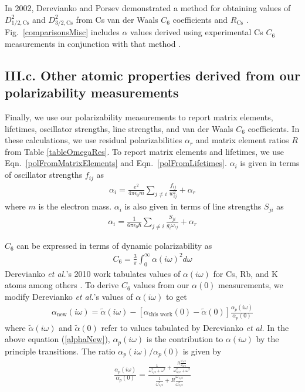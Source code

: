 \documentclass[twocolumn,pra,showpacs,superscriptaddress,longbibliography]{revtex4-1}   %
\newcommand{\figref}[1]{Fig.~\ref{#1}}
\newcommand{\eqnref}[1]{Eqn.~\eqref{#1}}
\newcommand{\rcs}{R_{\mathrm{Cs}}}
\newcommand{\etal}{\textit{et al.}}
\newcommand{\etalspace}{\textit{et al. }}
\begin{document}
In 2002, Derevianko and Porsev demonstrated a method for obtaining values of $D_{1/2,\mathrm{Cs}}^2$ and $D_{3/2,\mathrm{Cs}}^2$ from Cs van der Waals $C_6$ coefficients \cite{Derevianko2001} and $\rcs$ \cite{Rafac1998}. \figref{comparisonsMisc} includes $\alpha$ values derived using experimental Cs $C_6$ measurements in conjunction with that method \cite{Leo2000,Chin2004}.



\subsection{III.c. Other atomic properties derived from our polarizability measurements}

Finally, we use our polarizability measurements to report matrix elements, lifetimes, oscillator strengths, line strengths, and van der Waals $C_6$ coefficients.
In these calculations, we use residual polarizabilities $\alpha_r$ and matrix element ratios $R$ from Table \ref{tableOmegaRes}.
To report matrix elements and lifetimes, we use \eqnref{polFromMatrixElements} and \eqnref{polFromLifetimes}. $\alpha_i$ is given in terms of oscillator strengths $f_{ij}$ as 
\begin{align}
	\alpha_i = \frac{e^2}{4 \pi \epsilon_0 m}
	\sum_{j \neq i}
	\frac{f_{ij}}{w_{ij}^2}
	+ \alpha_r
	\label{polFromOscStr}
\end{align}
where $m$ is the electron mass. 
$\alpha_i$ is also given in terms of line strengths $S_{ji}$ as
\begin{align}
	\alpha_i = \frac{1}{6\pi\epsilon_0\hbar} 
	\sum_{j \neq i} 
	\frac{S_{ji}}{g_i\omega_{ij}}
	+ \alpha_r
	\label{polFromLineStr}
\end{align}


$C_6$ can be expressed in terms of dynamic polarizability as
\begin{align}
	C_6 = \frac{3}{\pi} \int_0^{\infty} \alpha(i\omega)^2 d\omega
	\label{C6fromPol}
\end{align}
Derevianko \etal's 2010 work tabulates values of $\alpha(i\omega)$ for Cs, Rb, and K atoms among others \cite{Derevianko2010}. To derive $C_6$ values from our $\alpha(0)$ measurements, we modify Derevianko \etal's values of $\alpha(i\omega)$ to get
\begin{align}
	\alpha_{\mathrm{new}}(i\omega) =
	\tilde{\alpha}(i\omega) -
	\left[\alpha_{\textrm{this work}}(0) - \tilde{\alpha}(0)\right]
	\frac{\alpha_p(i\omega)}{\alpha_p(0)}
	\label{alphaNew}
\end{align}
where $\tilde{\alpha}(i\omega)$ and $\tilde{\alpha}(0)$ refer to values tabulated by Derevianko \etalspace
In the above equation (\ref{alphaNew}), $\alpha_p(i\omega)$ is the contribution to $\alpha(i\omega)$ by the principle transitions. The ratio $\alpha_p(i\omega)/\alpha_p(0)$ is given by
\begin{align}
	\frac{\alpha_p(i\omega)}{\alpha_p(0)} = \frac
	{
		\frac{1}{\omega_{1/2}^2+\omega^2} + \frac{R\frac{\omega_{1/2}}{\omega_{3/2}}}{\omega_{3/2}^2+\omega^2}
	}
	{
		\frac{1}{\omega_{1/2}^2} + R\frac{\omega_{1/2}}{\omega^3_{3/2}}
	}
	\label{polPRatio}
\end{align}
\end{document}
